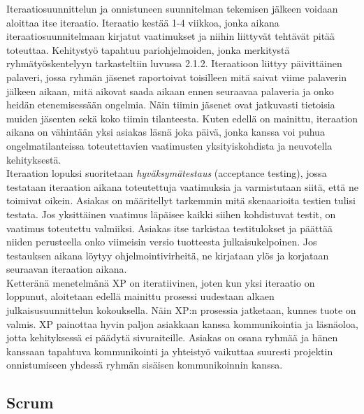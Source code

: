 \documentclass[finnish]{../tktltiki2}
\theoremstyle{definition}
\theoremstyle{remark}
\begin{document}
Iteraatiosuunnittelun ja onnistuneen suunnitelman tekemisen jälkeen voidaan aloittaa itse iteraatio. Iteraatio kestää 1-4 viikkoa, jonka aikana iteraatiosuunnitelmaan kirjatut vaatimukset ja niihin liittyvät tehtävät pitää toteuttaa. Kehitystyö tapahtuu pariohjelmoiden, jonka
merkitystä ryhmätyöskentelyyn tarkasteltiin luvussa 2.1.2. Iteraatioon liittyy päivittäinen palaveri, jossa ryhmän jäsenet raportoivat toisilleen mitä saivat viime palaverin jälkeen aikaan, mitä aikovat saada aikaan ennen seuraavaa palaveria ja onko heidän etenemisessään ongelmia. Näin tiimin jäsenet ovat jatkuvasti tietoisia
muiden jäsenten sekä koko tiimin tilanteesta. Kuten edellä on mainittu, iteraation aikana on vähintään yksi asiakas läsnä joka päivä, jonka kanssa voi puhua ongelmatilanteissa toteutettavien vaatimusten yksityiskohdista ja neuvotella kehityksestä.\\

Iteraation lopuksi suoritetaan \emph{hyväksymätestaus} (acceptance testing), jossa testataan iteraation aikana toteutettuja vaatimuksia ja varmistutaan siitä, että ne toimivat oikein. Asiakas on määritellyt tarkemmin mitä skenaarioita testien tulisi testata. Jos yksittäinen vaatimus läpäisee kaikki siihen kohdistuvat testit, on vaatimus toteutettu valmiiksi. Asiakas itse tarkistaa testitulokset ja päättää niiden perusteella onko viimeisin versio tuotteesta julkaisukelpoinen. Jos testauksen aikana löytyy ohjelmointivirheitä, ne kirjataan ylös ja korjataan seuraavan iteraation aikana.\\

Ketteränä menetelmänä XP on iteratiivinen, joten kun yksi iteraatio on loppunut, aloitetaan edellä mainittu prosessi uudestaan alkaen julkaisusuunnittelun kokouksella. Näin XP:n prosessia jatketaan, kunnes tuote on valmis. XP painottaa hyvin paljon asiakkaan kanssa kommunikointia ja läsnäoloa, jotta kehityksessä ei päädytä sivuraiteille. Asiakas on osana ryhmää ja hänen kanssaan tapahtuva kommunikointi ja yhteistyö vaikuttaa suuresti projektin onnistumiseen yhdessä ryhmän sisäisen kommunikoinnin kanssa.

\subsection{Scrum}
\end{document}
